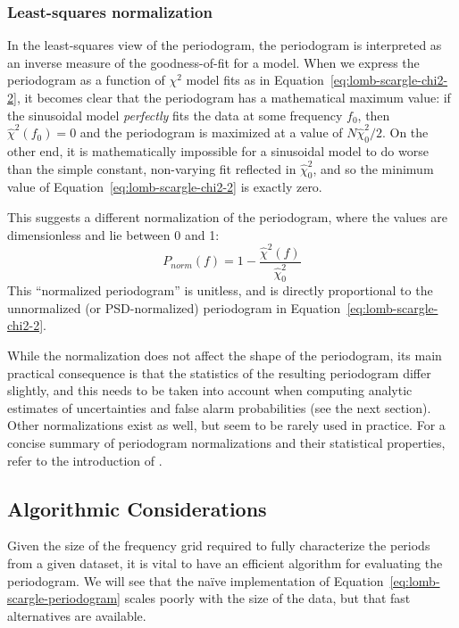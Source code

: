 \documentclass[preprint]{aastex}
\newcommand{\Eq}[1]{Equation~\ref{eq:#1}}
\newcommand{\eq}[1]{\Eq{#1}}
\newcommand{\eqlabel}[1]{\label{eq:#1}}
\newcommand{\sectlabel}[1]{\label{sect:#1}}
\begin{document}
\subsubsection{Least-squares normalization}
In the least-squares view of the periodogram, the periodogram is interpreted
as an inverse measure of the goodness-of-fit for a model.
When we express the periodogram as a function of $\chi^2$ model fits as in
\eq{lomb-scargle-chi2-2}, it becomes clear that the periodogram has a
mathematical maximum value: if the sinusoidal model {\it perfectly} fits
the data at some frequency $f_0$, then $\hat{\chi}^2(f_0) = 0$ and the
periodogram is maximized at a value of $N\hat{\chi}^2_0 / 2$.
On the other end, it is mathematically impossible for a sinusoidal model to
do worse than the simple constant, non-varying fit reflected in
$\hat{\chi}^2_0$, and so the minimum value of \eq{lomb-scargle-chi2-2} is
exactly zero.

This suggests a different normalization of the periodogram, where the values
are dimensionless and lie between 0 and 1:
\begin{equation}
  P_{norm}(f) = 1 - \frac{\hat{\chi}^2(f)}{\hat{\chi}^2_0}
  \eqlabel{lomb-scargle-normalized}
\end{equation}
This ``normalized periodogram'' is unitless, and
is directly proportional to the unnormalized
(or PSD-normalized) periodogram in \eq{lomb-scargle-chi2-2}.

While the normalization does not affect the shape of the periodogram,
its main practical consequence is that the statistics of the resulting
periodogram differ slightly, and this needs to be taken into account when
computing analytic estimates of uncertainties and false alarm probabilities
(see the next section).
Other normalizations exist as well, but seem to be rarely used in practice.
For a concise summary of periodogram normalizations and their statistical
properties, refer to the introduction of \citet{Baluev2008}.




\subsection{Algorithmic Considerations}
\sectlabel{algorithmic-considerations}
Given the size of the frequency grid required to fully characterize the periods
from a given dataset, it is vital to have an efficient algorithm for evaluating
the periodogram. We will see that the na{\"i}ve implementation of
\eq{lomb-scargle-periodogram} scales poorly with the size of the data, but that
fast alternatives are available.
\end{document}
